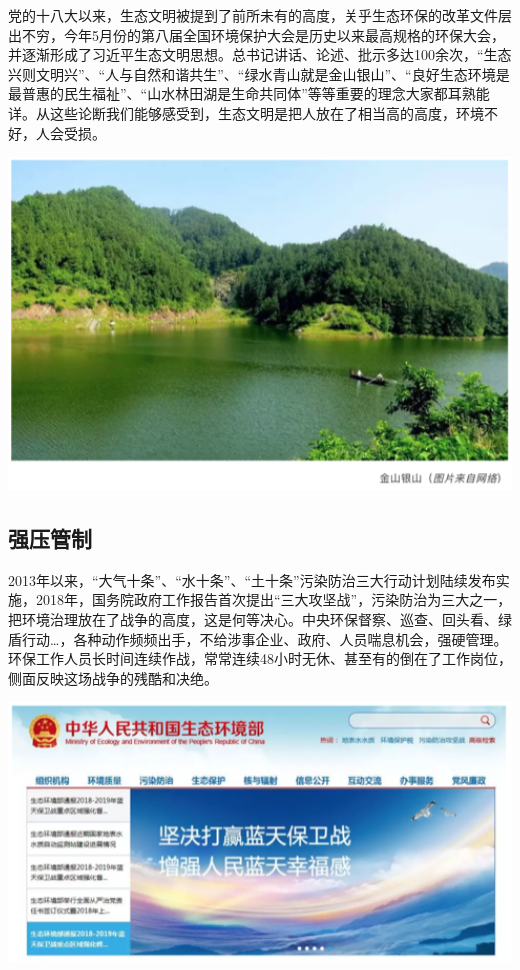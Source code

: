 \documentclass[]{book}
\begin{document}
党的十八大以来，生态文明被提到了前所未有的高度，关乎生态环保的改革文件层出不穷，今年5月份的第八届全国环境保护大会是历史以来最高规格的环保大会，并逐渐形成了习近平生态文明思想。总书记讲话、论述、批示多达100余次，``生态兴则文明兴''、``人与自然和谐共生''、``绿水青山就是金山银山''、``良好生态环境是最普惠的民生福祉''、``山水林田湖是生命共同体''等等重要的理念大家都耳熟能详。从这些论断我们能够感受到，生态文明是把人放在了相当高的高度，环境不好，人会受损。

\includegraphics[width=6.67in]{images/fw2}

\hypertarget{ux5f3aux538bux7ba1ux5236}{%
\subsection{强压管制}\label{ux5f3aux538bux7ba1ux5236}}

2013年以来，``大气十条''、``水十条''、``土十条''污染防治三大行动计划陆续发布实施，2018年，国务院政府工作报告首次提出``三大攻坚战''，污染防治为三大之一，把环境治理放在了战争的高度，这是何等决心。中央环保督察、巡查、回头看、绿盾行动\ldots{}，各种动作频频出手，不给涉事企业、政府、人员喘息机会，强硬管理。环保工作人员长时间连续作战，常常连续48小时无休、甚至有的倒在了工作岗位，侧面反映这场战争的残酷和决绝。

\includegraphics[width=6.67in]{images/fw3}
\end{document}
